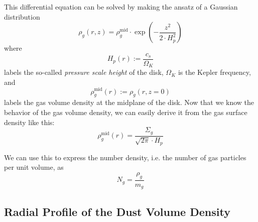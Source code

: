        This differential equation can be solved by making the ansatz of a Gaussian distribution
        \begin{equation}
            \boxed{
                \rho_g(r,z) = \rho_g^\text{mid}\cdot\exp\left(-\frac{z^2}{2\cdot H_p^2}\right)
            }
        \end{equation}
        where
        \begin{equation}
            H_p(r) :=\frac{c_s}{\Omega_K}  %
        \end{equation}
        labels the so-called \textit{pressure scale height} of the disk,
        $\Omega_K$ is the Kepler frequency,
        and
        \begin{equation}
            \rho_g^\text{mid}(r) := \rho_g(r,z=0)
        \end{equation}
        labels the gas volume density at the midplane of the disk.
        Now that we know the behavior of the gas volume density, we can easily derive it from 
        the gas surface density like this: %
        \begin{equation}
            \label{eq:gas_volume_density_vs_distance_from_star}
            \boxed{\rho_g^\text{mid}(r) =\frac{\Sigma_g}{\sqrt{2\pi}\cdot H_p}}
        \end{equation}


        We can use this to express the number density, i.e. 
        the number of gas particles per unit volume, as
        \begin{equation}
            N_g
                =\frac{\rho_g}{m_g}
        \end{equation}


    \subsection{Radial Profile of the Dust Volume Density}

